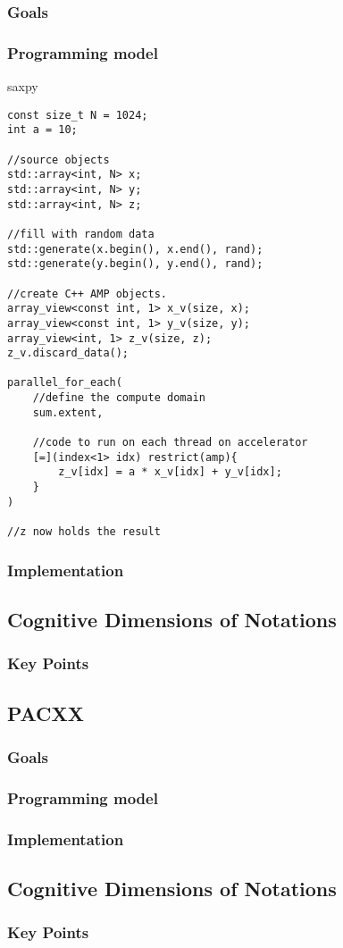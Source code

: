 \subsubsection{Goals}

\subsubsection{Programming model}
saxpy
\begin{lstlisting}[caption={C++ AMP saxpy example}, label={code:cppampSaxpy}]
const size_t N = 1024;
int a = 10;

//source objects
std::array<int, N> x;
std::array<int, N> y;
std::array<int, N> z;

//fill with random data
std::generate(x.begin(), x.end(), rand);
std::generate(y.begin(), y.end(), rand);

//create C++ AMP objects.
array_view<const int, 1> x_v(size, x);
array_view<const int, 1> y_v(size, y);
array_view<int, 1> z_v(size, z);
z_v.discard_data();

parallel_for_each(
    //define the compute domain
    sum.extent,

    //code to run on each thread on accelerator
    [=](index<1> idx) restrict(amp){
        z_v[idx] = a * x_v[idx] + y_v[idx];
    }
)

//z now holds the result
\end{lstlisting}

\subsubsection{Implementation}

\subsection{Cognitive Dimensions of Notations}

\subsubsection{Key Points}


\subsection{PACXX}

\subsubsection{Goals}

\subsubsection{Programming model}

\subsubsection{Implementation}

\subsection{Cognitive Dimensions of Notations}

\subsubsection{Key Points}